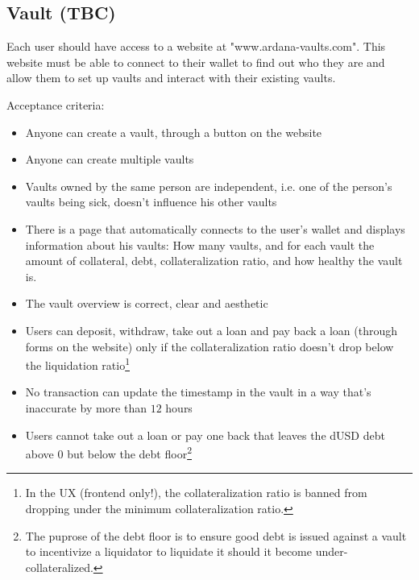 \documentclass{article} %
\begin{document}
\subsection{Vault (TBC)}

Each user should have access to a website at "www.ardana-vaults.com". This
website must be able to connect to their wallet to find out who they are and
allow them to set up vaults and interact with their existing vaults.

Acceptance criteria:
\begin{itemize}
  \item Anyone can create a vault, through a button on the website
  \item Anyone can create multiple vaults
  \item Vaults owned by the same person are independent, i.e. one of the
    person's vaults being sick, doesn't influence his other vaults
  \item There is a page that automatically connects to the user's wallet and
    displays information about his vaults: How many vaults, and for each vault
    the amount of collateral, debt, collateralization ratio, and how healthy the
    vault is.
  \item The vault overview is correct, clear and aesthetic
  \item Users can deposit, withdraw, take out a loan and pay back a loan
    (through forms on the website) only if the collateralization ratio doesn't
    drop below the liquidation ratio\footnote{
      In the UX (frontend only!), the collateralization ratio is banned from
      dropping under the minimum collateralization ratio.}
  \item No transaction can update the timestamp in the vault in a way that's
    inaccurate by more than $12$ hours
  \item Users cannot take out a loan or pay one back that leaves the dUSD debt
    above $0$ but below the debt floor\footnote{
    The puprose of the debt floor is to ensure good debt is issued against a
    vault to incentivize a liquidator to liquidate it should it become
    under-collateralized.}
% 


\end{itemize}
\end{document}
